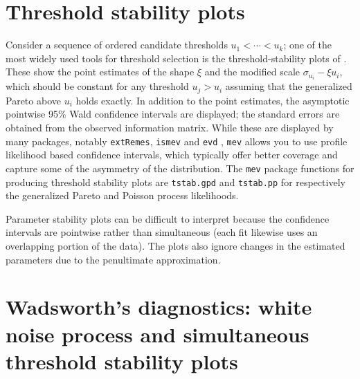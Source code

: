 \documentclass[]{book}
\begin{document}
\hypertarget{threshold-stability-plots}{%
\section{Threshold stability plots}\label{threshold-stability-plots}}

Consider a sequence of ordered candidate thresholds \(u_1 < \cdots < u_k\); one of the most widely used tools for threshold selection is the threshold-stability plots of \citet{Davison:1990}. These show the point estimates of the shape \(\xi\) and the modified scale \(\sigma_{u_i}-\xi u_i\), which should be constant for any threshold \(u_{j} >u_i\) assuming that the generalized Pareto above \(u_i\) holds exactly. In addition to the point estimates, the asymptotic pointwise 95\% Wald confidence intervals are displayed; the standard errors are obtained from the observed information matrix. While these are displayed by many packages, notably \texttt{extRemes}, \texttt{ismev} and \texttt{evd} , \texttt{mev} allows you to use profile likelihood based confidence intervals, which typically offer better coverage and capture some of the asymmetry of the distribution. The \texttt{mev} package functions for producing threshold stability plots are \texttt{tstab.gpd} and \texttt{tstab.pp} for respectively the generalized Pareto and Poisson process likelihoods.

Parameter stability plots can be difficult to interpret because the confidence intervals are pointwise rather than simultaneous (each fit likewise uses an overlapping portion of the data). The plots also ignore changes in the estimated parameters due to the penultimate approximation.

\hypertarget{wadsworths-diagnostics-white-noise-process-and-simultaneous-threshold-stability-plots}{%
\section{Wadsworth's diagnostics: white noise process and simultaneous threshold stability plots}\label{wadsworths-diagnostics-white-noise-process-and-simultaneous-threshold-stability-plots}}
\end{document}
